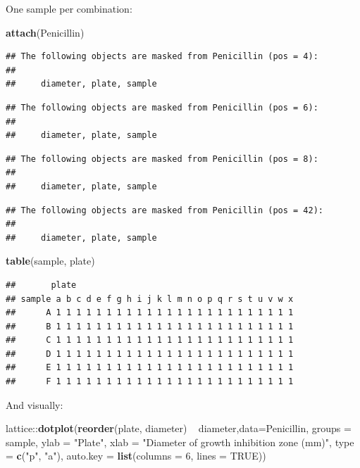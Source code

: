 \documentclass[]{book}
\newenvironment{Shaded}{\begin{snugshade}}{\end{snugshade}}
\newcommand{\KeywordTok}[1]{\textcolor[rgb]{0.13,0.29,0.53}{\textbf{{#1}}}}
\newcommand{\DataTypeTok}[1]{\textcolor[rgb]{0.13,0.29,0.53}{{#1}}}
\newcommand{\DecValTok}[1]{\textcolor[rgb]{0.00,0.00,0.81}{{#1}}}
\newcommand{\StringTok}[1]{\textcolor[rgb]{0.31,0.60,0.02}{{#1}}}
\newcommand{\OtherTok}[1]{\textcolor[rgb]{0.56,0.35,0.01}{{#1}}}
\newcommand{\NormalTok}[1]{{#1}}
\theoremstyle{definition}
\theoremstyle{definition}
\theoremstyle{remark}
\begin{document}
One sample per combination:

\begin{Shaded}
\begin{Highlighting}[]
\KeywordTok{attach}\NormalTok{(Penicillin)}
\end{Highlighting}
\end{Shaded}

\begin{verbatim}
## The following objects are masked from Penicillin (pos = 4):
## 
##     diameter, plate, sample
\end{verbatim}

\begin{verbatim}
## The following objects are masked from Penicillin (pos = 6):
## 
##     diameter, plate, sample
\end{verbatim}

\begin{verbatim}
## The following objects are masked from Penicillin (pos = 8):
## 
##     diameter, plate, sample
\end{verbatim}

\begin{verbatim}
## The following objects are masked from Penicillin (pos = 42):
## 
##     diameter, plate, sample
\end{verbatim}

\begin{Shaded}
\begin{Highlighting}[]
\KeywordTok{table}\NormalTok{(sample, plate)}
\end{Highlighting}
\end{Shaded}

\begin{verbatim}
##       plate
## sample a b c d e f g h i j k l m n o p q r s t u v w x
##      A 1 1 1 1 1 1 1 1 1 1 1 1 1 1 1 1 1 1 1 1 1 1 1 1
##      B 1 1 1 1 1 1 1 1 1 1 1 1 1 1 1 1 1 1 1 1 1 1 1 1
##      C 1 1 1 1 1 1 1 1 1 1 1 1 1 1 1 1 1 1 1 1 1 1 1 1
##      D 1 1 1 1 1 1 1 1 1 1 1 1 1 1 1 1 1 1 1 1 1 1 1 1
##      E 1 1 1 1 1 1 1 1 1 1 1 1 1 1 1 1 1 1 1 1 1 1 1 1
##      F 1 1 1 1 1 1 1 1 1 1 1 1 1 1 1 1 1 1 1 1 1 1 1 1
\end{verbatim}

And visually:

\begin{Shaded}
\begin{Highlighting}[]
\NormalTok{lattice::}\KeywordTok{dotplot}\NormalTok{(}\KeywordTok{reorder}\NormalTok{(plate, diameter) ~}\StringTok{ }\NormalTok{diameter,}\DataTypeTok{data=}\NormalTok{Penicillin,}
              \DataTypeTok{groups =} \NormalTok{sample,}
              \DataTypeTok{ylab =} \StringTok{"Plate"}\NormalTok{, }\DataTypeTok{xlab =} \StringTok{"Diameter of growth inhibition zone (mm)"}\NormalTok{,}
              \DataTypeTok{type =} \KeywordTok{c}\NormalTok{(}\StringTok{"p"}\NormalTok{, }\StringTok{"a"}\NormalTok{), }\DataTypeTok{auto.key =} \KeywordTok{list}\NormalTok{(}\DataTypeTok{columns =} \DecValTok{6}\NormalTok{, }\DataTypeTok{lines =} \OtherTok{TRUE}\NormalTok{))}
\end{Highlighting}
\end{Shaded}
\end{document}
